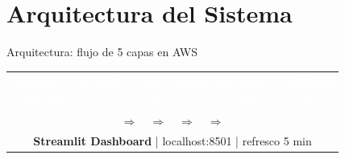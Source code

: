 \documentclass[14pt,aspectratio=169]{beamer}
\begin{document}
\section{Arquitectura del Sistema}

\begin{frame}{Arquitectura: flujo de 5 capas en AWS}
  \vspace{0.2em}
  \begin{center}
  \setlength{\tabcolsep}{3pt}
  \begin{tabular}{ccccc}
    \cellcolor{agroazul!80}\textcolor{white}{\footnotesize\textbf{Fuentes}} &
    \cellcolor{agronaranja!80}\textcolor{white}{\footnotesize\textbf{S3 Raw}} &
    \cellcolor{agrolight}\textcolor{white}{\footnotesize\textbf{EMR+Spark}} &
    \cellcolor{agroverde}\textcolor{white}{\footnotesize\textbf{S3 Gold}} &
    \cellcolor{agrogris}\textcolor{white}{\footnotesize\textbf{Cassandra}} \\
    \cellcolor{agroazul!80}\textcolor{white}{\tiny NASA/IoT} &
    \cellcolor{agronaranja!80}\textcolor{white}{\tiny 3 capas} &
    \cellcolor{agrolight}\textcolor{white}{\tiny ETL + ML} &
    \cellcolor{agroverde}\textcolor{white}{\tiny 4 CSV} &
    \cellcolor{agrogris}\textcolor{white}{\tiny 5 tablas} \\[0.3em]
    \multicolumn{5}{c}{$\Rightarrow\quad\Rightarrow\quad\Rightarrow\quad\Rightarrow$} \\
    \multicolumn{5}{c}{\cellcolor{agromid!40}
      \textbf{Streamlit Dashboard} | localhost:8501 | refresco 5 min}
  \end{tabular}
  \end{center}


\end{frame}
\end{document}
